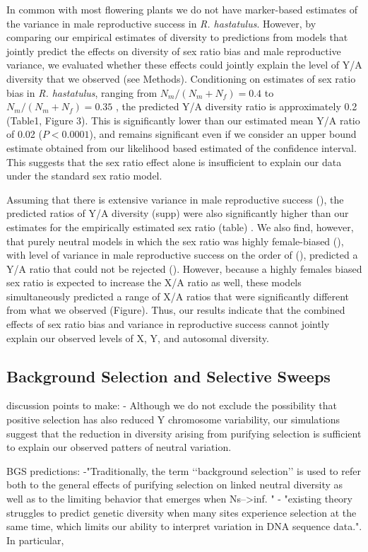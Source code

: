 \documentclass[9pt,twocolumn,twoside]{gsajnl}
\begin{document}
In common with most flowering plants we do not have marker-based estimates of the variance in male reproductive success in \textit{R. hastatulus}. However, by comparing our empirical estimates of diversity to predictions from models that jointly predict the effects on diversity of sex ratio bias and male reproductive variance, we evaluated whether these effects could jointly explain the level of Y/A diversity that we observed (see Methods). Conditioning on estimates of sex ratio bias in \textit{R. hastatulus}, ranging from $N_{m}/(N_{m}+N_{f})=0.4$ to $N_{m}/(N_{m}+N_{f})=0.35$ \citep{pickup2013influence}, the predicted Y/A diversity ratio  is approximately 0.2 (Table1, Figure 3). This is significantly lower than our estimated mean Y/A ratio of 0.02 ($\textit{P}<0.0001$), and remains significant even if we consider an upper bound estimate obtained from our likelihood based estimated of the confidence interval. This suggests that the sex ratio effect alone is insufficient to explain our data under the standard sex ratio model.

Assuming that there is extensive variance in male reproductive success (\X), the predicted ratios of Y/A diversity (\X supp) were also significantly higher than our estimates for the empirically estimated sex ratio (\X table) . We also find, however, that purely neutral models in which the sex ratio was highly female-biased (\X), with level of variance in male reproductive success on the order of (\X), predicted a Y/A ratio that could not be rejected (\X). However, because a highly females biased sex ratio is expected to increase the X/A ratio as well, these models simultaneously predicted a range of X/A ratios that were significantly different from what we observed (\X Figure). Thus, our results indicate that the combined effects of sex ratio bias and variance in reproductive success cannot jointly explain our observed levels of X, Y, and autosomal diversity.

\subsection*{Background Selection and Selective Sweeps}


discussion points to make:
- Although we do not exclude the possibility that positive selection has also reduced Y chromosome variability, our simulations suggest that the reduction in diversity arising from purifying selection is sufficient to explain our observed patters of neutral variation.

BGS predictions:
-"Traditionally, the term ‘‘background selection’’ is used to refer both to the general effects of purifying selection on linked neutral diversity as well as to the limiting behavior that emerges when Ns-->inf. "
- "existing theory struggles to predict genetic diversity when many sites experience selection at the same time, which limits our ability to interpret variation in DNA sequence data.". In particular,
\end{document}
